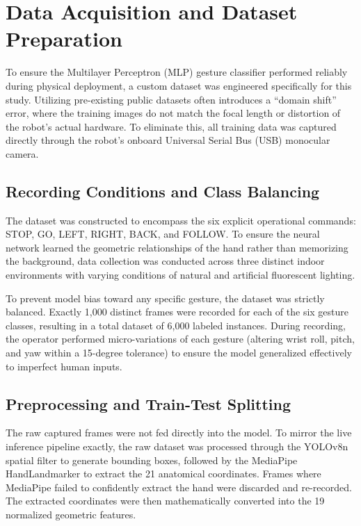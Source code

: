 \section{Data Acquisition and Dataset Preparation}
To ensure the Multilayer Perceptron (MLP) gesture classifier performed reliably during physical deployment, a custom dataset was engineered specifically for this study. Utilizing pre-existing public datasets often introduces a ``domain shift'' error, where the training images do not match the focal length or distortion of the robot's actual hardware. To eliminate this, all training data was captured directly through the robot's onboard Universal Serial Bus (USB) monocular camera.

\subsection{Recording Conditions and Class Balancing}
\label{sec:recording_conditions}
The dataset was constructed to encompass the six explicit operational commands: STOP, GO, LEFT, RIGHT, BACK, and FOLLOW. To ensure the neural network learned the geometric relationships of the hand rather than memorizing the background, data collection was conducted across three distinct indoor environments with varying conditions of natural and artificial fluorescent lighting. 

To prevent model bias toward any specific gesture, the dataset was strictly balanced. Exactly 1,000 distinct frames were recorded for each of the six gesture classes, resulting in a total dataset of 6,000 labeled instances. During recording, the operator performed micro-variations of each gesture (altering wrist roll, pitch, and yaw within a 15-degree tolerance) to ensure the model generalized effectively to imperfect human inputs.

\subsection{Preprocessing and Train-Test Splitting}
The raw captured frames were not fed directly into the model. To mirror the live inference pipeline exactly, the raw dataset was processed through the YOLOv8n spatial filter to generate bounding boxes, followed by the MediaPipe HandLandmarker to extract the 21 anatomical coordinates. Frames where MediaPipe failed to confidently extract the hand were discarded and re-recorded. The extracted coordinates were then mathematically converted into the 19 normalized geometric features.

